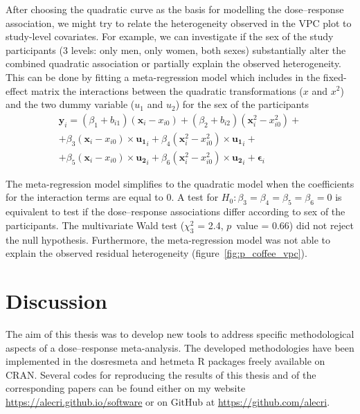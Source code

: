 \documentclass[11pt,a4paper,twoside,openany]{book}\usepackage{knitr}
\newcommand{\pkg}[1]{{\fontseries{b}\selectfont #1}}
\begin{document}
{After choosing the quadratic curve as the basis for modelling the dose--response association, we might try to relate the heterogeneity observed in the VPC plot to study-level covariates. For example, we can investigate if the sex of the study participants (3 levels: only men, only women, both sexes) substantially alter the combined quadratic association or partially explain the observed heterogeneity. This can be done by fitting a meta-regression model which includes in the fixed-effect matrix the interactions between the quadratic transformations ($x$ and $x^2$) and the two dummy variable ($u_1$ and $u_2$) for the sex of the participants
\begin{multline*}
\mathbf{y}_i = (\beta_1 + b_{i1}) (\mathbf{x}_{i} - {x}_{i0}) + (\beta_2  + b_{i2}) (\mathbf{x}_{i}^2 - {x}_{i0}^2) +  \\
+ \beta_3 (\mathbf{x}_{i} - {x}_{i0}) \times \mathbf{u_1}_{i} + \beta_4 (\mathbf{x}_{i}^2 - {x}_{i0}^2)\times \mathbf{u_1}_{i}  + \\ 
 + \beta_5 (\mathbf{x}_{i} - {x}_{i0}) \times \mathbf{u_2}_{i} + \beta_6 (\mathbf{x}_{i}^2 - {x}_{i0}^2)\times \mathbf{u_2}_{i}  + 
\boldsymbol{\epsilon}_{i}
\end{multline*}

\noindent The meta-regression model simplifies to the quadratic model when the coefficients for the interaction terms are equal to 0. A test for $H_0: \beta_3 = \beta_4 = \beta_5 = \beta_6 = 0$ is equivalent to test if the dose--response associations differ according to sex of the participants.  The multivariate Wald test ($\chi_3^2$ = 2.4, $p$~value = 0.66) did not reject the null hypothesis. Furthermore, the meta-regression model was not able to explain the observed residual heterogeneity (figure~\ref{fig:p_coffee_vpc}).


%

\chapter{Discussion}

The aim of this thesis was to develop new tools to address specific methodological aspects of a dose--response meta-analysis. The developed methodologies have been implemented in the \pkg{dosresmeta} and \pkg{hetmeta} \textsf{R} packages freely available on CRAN. Several codes for reproducing the results of this thesis and of the corresponding papers can be found either on my website \url{ https://alecri.github.io/software} or on GitHub at \url{ https://github.com/alecri}.


}
\end{document}
